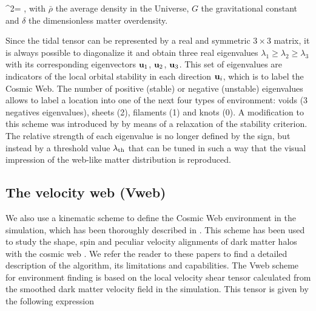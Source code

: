 \documentclass[a4,useAMS,usenatbib,usegraphicx]{latex/mn2e}
\begin{document}
{	\nabla^2\phi = \delta,	}
with $\bar{\rho}$ the average density in the Universe, $G$ the 
gravitational constant and $\delta$ the dimensionless matter
overdensity. 


Since the tidal tensor can be represented by a real and  symmetric
$3\times 3$ matrix, it is always possible to diagonalize  
it and obtain three real eigenvalues $\lambda_{1}\geq\lambda_{2}\geq
\lambda_3$ with its corresponding eigenvectors ${\bf u}_{1}$, ${\bf u}_{2}$,
${\bf u}_{3}$. 
This set of eigenvalues are indicators of the local  orbital stability
in each direction ${\bf u}_i$, which is to label the Cosmic Web.
The number of positive (stable) or negative (unstable) eigenvalues allows 
to label a location into one of the next four types of environment: 
voids (3 negatives eigenvalues), sheets (2), filaments (1) and knots (0). 
A modification to this scheme was introduced by \citet{Forero09}
by means of a relaxation of the stability criterion. The relative strength 
of each eigenvalue is no longer defined by the sign, but instead by a
threshold value $\lambda_{\rm th}$ that can be tuned in such a way
that the visual impression of the web-like matter distribution is
reproduced. 
 
\subsection{The velocity web (Vweb)}
\label{subsec:Vweb}


We also use a kinematic scheme to define the Cosmic Web environment in 
the simulation, which has been thoroughly described in 
\cite{Hoffman12}.
This scheme has been used to study the shape, spin and peculiar
velocity alignments of dark matter halos with the cosmic web
\citep{Libeskind13,Forero2014}. 
We refer the reader to these papers to find a detailed description of
the algorithm, its limitations  and capabilities.    
The Vweb scheme for environment finding is based on the
local velocity shear tensor calculated from the smoothed dark matter 
velocity field in the simulation. This tensor is given by the 
following expression
\end{document}
